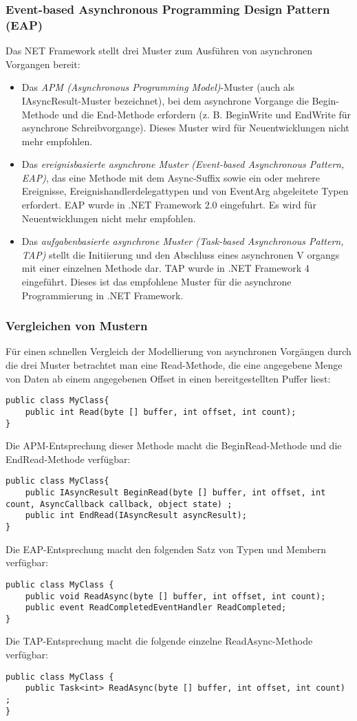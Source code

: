 \subsubsection{Event-based Asynchronous Programming Design Pattern (EAP)}
Das NET Framework stellt drei Muster zum Ausführen von
asynchronen Vorgangen bereit:
\begin{itemize}
\item Das \emph{APM (Asynchronous Programming Model)}-Muster (auch als IAsyncResult-Muster bezeichnet), bei dem asynchrone Vorgange die Begin-Methode und die End-Methode erfordern (z. B. BeginWrite und EndWrite für asynchrone Schreibvorgange). Dieses Muster wird für Neuentwicklungen nicht mehr empfohlen.
\item Das \emph{ereignisbasierte asynchrone Muster (Event-based Asynchronous Pattern, EAP)}, das eine Methode mit dem Async-Suffix sowie ein oder mehrere Ereignisse, Ereignishandlerdelegattypen und von EventArg abgeleitete Typen erfordert. EAP wurde in .NET Framework 2.0 eingefuhrt. Es wird für Neuentwicklungen nicht mehr empfohlen.
\item Das \emph{aufgabenbasierte asynchrone Muster (Task-based Asynchronous Pattern, TAP)} stellt die Initiierung und den Abschluss eines asynchronen V organgs mit einer einzelnen Methode dar. TAP wurde in .NET Framework 4 eingeführt. Dieses ist das empfohlene Muster für die asynchrone Programmierung in .NET Framework.
\end{itemize}
\subsubsection{Vergleichen von Mustern}
Für einen schnellen Vergleich der Modellierung von asynchronen Vorgängen durch die drei Muster betrachtet man eine Read-Methode, die eine angegebene Menge von Daten ab einem angegebenen Offset in einen bereitgestellten Puffer liest:
\begin{lstlisting}[language={[Sharp]C}]
public class MyClass{
	public int Read(byte [] buffer, int offset, int count);
}
\end{lstlisting}
Die APM-Entsprechung dieser Methode macht die BeginRead-Methode und die EndRead-Methode verfügbar:
\begin{lstlisting}[language={[Sharp]C}]
public class MyClass{
	public IAsyncResult BeginRead(byte [] buffer, int offset, int count, AsyncCallback callback, object state) ;
	public int EndRead(IAsyncResult asyncResult);
}
\end{lstlisting}
Die EAP-Entsprechung macht den folgenden Satz von Typen und Membern verfügbar:
\begin{lstlisting}[language={[Sharp]C}]
public class MyClass {
	public void ReadAsync(byte [] buffer, int offset, int count);
	public event ReadCompletedEventHandler ReadCompleted;
}
\end{lstlisting}
Die TAP-Entsprechung macht die folgende einzelne ReadAsync-Methode verfügbar:
\begin{lstlisting}[language={[Sharp]C}]
public class MyClass {
	public Task<int> ReadAsync(byte [] buffer, int offset, int count) ;
}
\end{lstlisting}
